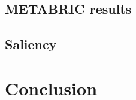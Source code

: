 \documentclass[12pt,a4paper,twoside,openright]{report}
\renewcommand{\baselinestretch}{1.1}    %
\begin{document}
\section{METABRIC results}

\section{Saliency}

\chapter{Conclusion}



 
 



\end{document}
